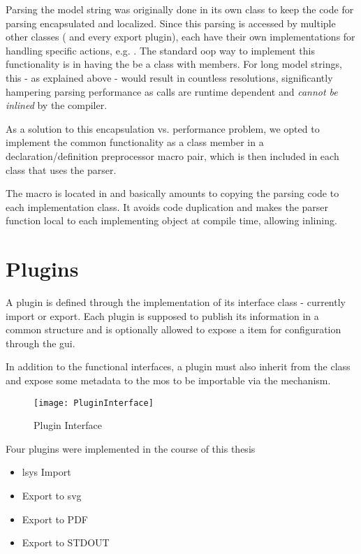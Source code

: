 Parsing the model string was originally done in its own class to keep the code for parsing encapsulated and localized. Since this parsing is accessed by multiple other classes ( and every export plugin), each have their own implementations for handling specific actions, e.g. . The standard \gls{oop} way to implement this functionality is in having the  be a class with  members. For long model strings, this - as explained above - would result in countless  resolutions, significantly hampering parsing performance as  calls are runtime dependent and \emph{cannot be inlined} by the compiler.

As a solution to this encapsulation vs. performance problem, we opted to implement the common functionality as a class member in a declaration/definition preprocessor macro pair, which is then included in each class that uses the parser.

The macro is located in  and basically amounts to copying the parsing code to each implementation class. It avoids code duplication and makes the parser function local to each implementing object at compile time, allowing inlining.

\section{Plugins}
A plugin is defined through the implementation of its interface class - currently import or export. Each plugin is supposed to publish its information in a common  structure and is optionally allowed to expose a  item for configuration through the \gls{gui}.

In addition to the functional interfaces, a plugin must also inherit from the  class and expose some metadata to the \gls{mos} to be importable via the  mechanism.

\begin{figure}[htb]
	\texttt{[image: PluginInterface]}
	\caption{Plugin Interface}
	\label{fig:plugint}
\end{figure}

Four plugins were implemented in the course of this thesis
\begin{itemize}
	\item \gls{lsys} Import
	\item Export to \gls{svg}
	\item Export to PDF
	\item Export to STDOUT
\end{itemize}

